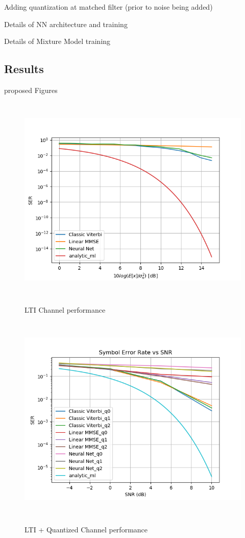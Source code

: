 \documentclass[12pt,a4paper]{report}
\begin{document}
Adding quantization at matched filter (prior to noise being added)


Details of NN architecture and training

Details of Mixture Model training

\subsection{Results}
proposed Figures
\begin{figure}[H]
	  \caption{LTI Channel performance}
	\includegraphics[width=\textwidth,height = 10cm]{results/lti_normal}
	  \label{fig:LTI Channel}
\end{figure}

\begin{figure}[H]
	  \caption{LTI + Quantized Channel performance}
	\includegraphics[width=\textwidth,height = 10cm]{results/lti_quantized}
	  \label{fig:LTI_quant Channel}
\end{figure}
\end{document}
